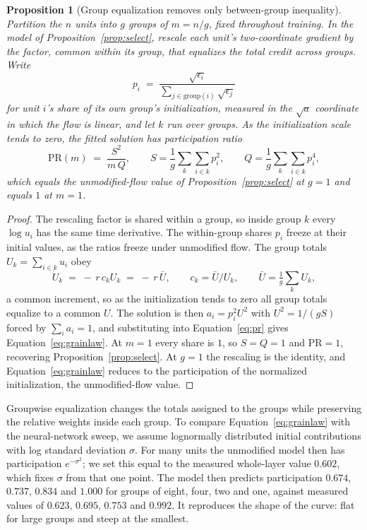 \documentclass{article} %
\newtheorem{proposition}{Proposition}
\begin{document}
\begin{proposition}[Group equalization removes only between-group inequality]
\label{prop:grain}
Partition the $n$ units into $g$ groups of $m = n/g$, fixed throughout training. In the model of Proposition~\ref{prop:select}, rescale each unit's two-coordinate gradient by the factor, common within its group, that equalizes the total credit across groups. Write
\begin{equation}
p_i \;=\; \frac{\sqrt{\epsilon_i}}{\sum_{j \in \mathrm{group}(i)} \sqrt{\epsilon_j}}
\label{eq:groupshare}
\end{equation}
for unit $i$'s share of its own group's initialization, measured in the $\sqrt{a}$ coordinate in which the flow is linear, and let $k$ run over groups. As the initialization scale tends to zero, the fitted solution has participation ratio
\begin{equation}
\mathrm{PR}(m) \;=\; \frac{S^2}{m\,Q},
\qquad
S = \frac{1}{g}\sum_{k}\sum_{i \in k} p_i^2,
\qquad
Q = \frac{1}{g}\sum_{k}\sum_{i \in k} p_i^4,
\label{eq:grainlaw}
\end{equation}
which equals the unmodified-flow value of Proposition~\ref{prop:select} at $g=1$ and equals $1$ at $m=1$.
\end{proposition}

\begin{proof}
The rescaling factor is shared within a group, so inside group $k$ every $\log u_i$ has the same time derivative. The within-group shares $p_i$ freeze at their initial values, as the ratios freeze under unmodified flow. The group totals $U_k = \sum_{i \in k} u_i$ obey
\begin{equation}
\dot{U}_k \;=\; -\,r\,c_k U_k \;=\; -\,r\,\bar{U},
\qquad c_k = \bar{U}/U_k,
\qquad \bar{U} = \tfrac{1}{g}\textstyle\sum_k U_k,
\end{equation}
a common increment, so as the initialization tends to zero all group totals equalize to a common $U$. The solution is then $a_i = p_i^2 U^2$ with $U^2 = 1/(gS)$ forced by $\sum_i a_i = 1$, and substituting into Equation~\ref{eq:pr} gives Equation~\ref{eq:grainlaw}. At $m=1$ every share is $1$, so $S = Q = 1$ and $\mathrm{PR} = 1$, recovering Proposition~\ref{prop:select}. At $g=1$ the rescaling is the identity, and Equation~\ref{eq:grainlaw} reduces to the participation of the normalized initialization, the unmodified-flow value.
\end{proof}

Groupwise equalization changes the totals assigned to the groups while preserving the relative weights inside each group. To compare Equation~\ref{eq:grainlaw} with the neural-network sweep, we assume lognormally distributed initial contributions with log standard deviation $\sigma$. For many units the unmodified model then has participation $e^{-\sigma^2}$; we set this equal to the measured whole-layer value $0.602$, which fixes $\sigma$ from that one point. The model then predicts participation $0.674$, $0.737$, $0.834$ and $1.000$ for groups of eight, four, two and one, against measured values of $0.623$, $0.695$, $0.753$ and $0.992$. It reproduces the shape of the curve: flat for large groups and steep at the smallest.
\end{document}
